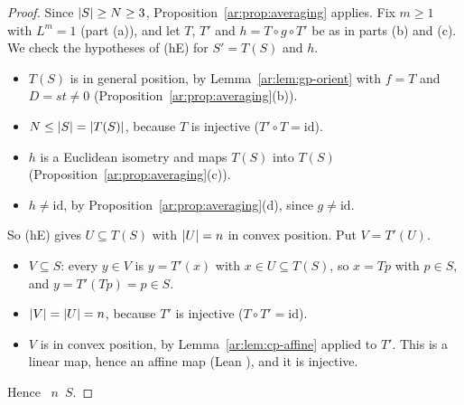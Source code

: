 \begin{proof}
Since $\lvert S\rvert\ge N\ge3$, Proposition~\ref{ar:prop:averaging} applies. Fix $m\ge1$ with $L^m=1$ (part (a)), and let
$T$, $T'$ and $h=T\circ g\circ T'$ be as in parts (b) and (c). We check the hypotheses of (hE) for $S'=T(S)$ and $h$.
\begin{itemize}
\item $T(S)$ is in general position, by Lemma~\ref{ar:lem:gp-orient} with $f=T$ and $D=st\ne0$
(Proposition~\ref{ar:prop:averaging}(b)).
\item $N\le\lvert S\rvert=\lvert T(S)\rvert$, because $T$ is injective ($T'\circ T=\mathrm{id}$).
\item $h$ is a Euclidean isometry and maps $T(S)$ into $T(S)$ (Proposition~\ref{ar:prop:averaging}(c)).
\item $h\ne\mathrm{id}$, by Proposition~\ref{ar:prop:averaging}(d), since $g\ne\mathrm{id}$.
\end{itemize}
So (hE) gives $U\subseteq T(S)$ with $\lvert U\rvert=n$ in convex position. Put $V=T'(U)$.
\begin{itemize}
\item $V\subseteq S$: every $y\in V$ is $y=T'(x)$ with $x\in U\subseteq T(S)$, so $x=Tp$ with $p\in S$, and
$y=T'(Tp)=p\in S$.
\item $\lvert V\rvert=\lvert U\rvert=n$, because $T'$ is injective ($T\circ T'=\mathrm{id}$).
\item $V$ is in convex position, by Lemma~\ref{ar:lem:cp-affine} applied to $T'$. This is a linear map, hence an
affine map (Lean ), and it is injective.
\end{itemize}
Hence ~$n$~$S$.
\end{proof}

